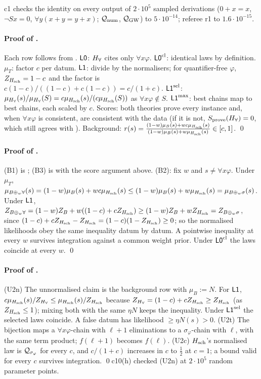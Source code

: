 c1 checks the identity on every output of $2\cdot10^5$ sampled derivations ($0+x=x$, $\neg Sx=0$, $\forall y(x+y=y+x)$; $\mathcal{Q}_{\mathrm{num}}$, $\mathcal{Q}_{\mathrm{GW}}$) to $5\cdot10^{-14}$; referee r1 to $1.6\cdot10^{-15}$.

\paragraph{Proof of .} Each row follows from . $\mathord{\mathsf{L0}}$: $H_{\forall}$ cites only $\forall x\varphi$. $\mathord{\mathsf{L0}}^{\mathrm{cl}}$: identical laws by definition. $\mu_T$: factor $c$ per datum. $\mathord{\mathsf{L1}}$: divide by the normalisers; for quantifier-free $\varphi$, $Z_{H_{\mathrm{sch}}}=1-c$ and the factor is $c(1-c)/((1-c)+c(1-c))=c/(1+c)$. $\mathord{\mathsf{L1}}^{\mathrm{sel}}$: $\mu_{H_{\forall}}(s)/\mu_{H_{\forall}}(S)=c\mu_{H_{\mathrm{sch}}}(s)/(c\mu_{H_{\mathrm{sch}}}(S))$ as $\forall x\varphi\notin S$. $\mathord{\mathsf{L1}}^{\max}$: best chains map to best chains, each scaled by $c$. Scores: both theories prove every instance and, when $\forall x\varphi$ is consistent, are consistent with the data (if it is not, $S_{\mathrm{prove}}(H_{\forall})=0$, which still agrees with ). Background: $r(s)=\frac{(1-w)\mu_B(s)+wc\mu_{H_{\mathrm{sch}}}(s)}{(1-w)\mu_B(s)+w\mu_{H_{\mathrm{sch}}}(s)}\in[c,1]$. \qed

\paragraph{Proof of .} (B1) is ; (B3) is  with the score argument above. (B2): fix $w$ and $s\neq\forall x\varphi$. Under $\mu_T$, $\mu_{B\oplus_w\forall}(s)=(1-w)\mu_B(s)+wc\mu_{H_{\mathrm{sch}}}(s)\le(1-w)\mu_B(s)+w\mu_{H_{\mathrm{sch}}}(s)=\mu_{B\oplus_w\sigma}(s)$. Under $\mathord{\mathsf{L1}}$, $Z_{B\oplus_w\forall}=(1-w)Z_B+w((1-c)+cZ_{H_{\mathrm{sch}}})\ge(1-w)Z_B+wZ_{H_{\mathrm{sch}}}=Z_{B\oplus_w\sigma}$, since $(1-c)+cZ_{H_{\mathrm{sch}}}-Z_{H_{\mathrm{sch}}}=(1-c)(1-Z_{H_{\mathrm{sch}}})\ge0$; so the normalised likelihoods obey the same inequality datum by datum. A pointwise inequality at every $w$ survives integration against a common weight prior. Under $\mathord{\mathsf{L0}}^{\mathrm{cl}}$ the laws coincide at every $w$. \qed

\paragraph{Proof of .} (U2n) The unnormalised claim is the background row with $\mu_B:=N$. For $\mathord{\mathsf{L1}}$, $c\mu_{H_{\mathrm{sch}}}(s)/Z_{H_{\forall}}\le\mu_{H_{\mathrm{sch}}}(s)/Z_{H_{\mathrm{sch}}}$ because $Z_{H_{\forall}}=(1-c)+cZ_{H_{\mathrm{sch}}}\ge Z_{H_{\mathrm{sch}}}$ (as $Z_{H_{\mathrm{sch}}}\le1$); mixing both with the same $\eta N$ keeps the inequality. Under $\mathord{\mathsf{L1}}^{\mathrm{sel}}$ the selected laws coincide. A false datum has likelihood $\ge\eta N(s)>0$. (U2t) The bijection maps a $\forall x\varphi$-chain with $\ell+1$ eliminations to a $\sigma_\varphi$-chain with $\ell$, with the same term product; $f(\ell+1)$ becomes $f(\ell)$. (U2c) $H_{\mathrm{sch}}$'s normalised law is $\mathcal{Q}_{\sigma_\varphi}$ for every $c$, and $c/(1+c)$ increases in $c$ to $\tfrac12$ at $c=1$; a bound valid for every $c$ survives integration. \qed c10(h) checked (U2n) at $2\cdot10^5$ random parameter points.

